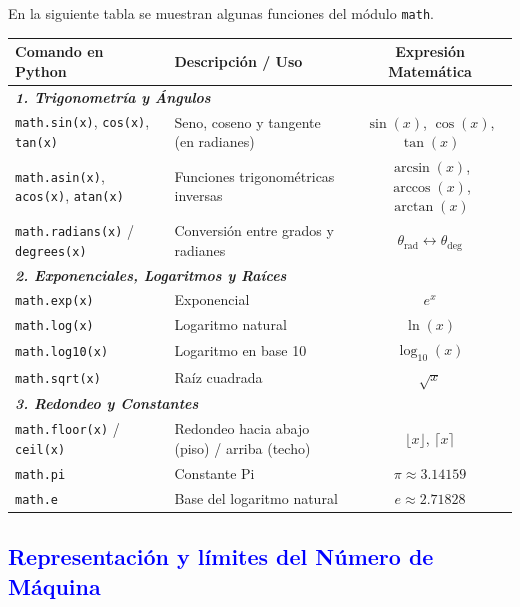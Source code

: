 \documentclass[12pt]{article}
\begin{document}
En la siguiente tabla se muestran algunas funciones del módulo \texttt{math}. 

\begin{table}[h!]
\centering
\small
\begin{tabular}{l l c}
\toprule
\textbf{Comando en Python} & \textbf{Descripción / Uso} & \textbf{Expresión Matemática} \\
\midrule

\multicolumn{3}{l}{\textbf{\textit{1. Trigonometría y Ángulos}}} \\
\texttt{math.sin(x)}, \texttt{cos(x)}, \texttt{tan(x)} & Seno, coseno y tangente (en radianes) & $\sin(x)$, $\cos(x)$, $\tan(x)$ \\
\texttt{math.asin(x)}, \texttt{acos(x)}, \texttt{atan(x)} & Funciones trigonométricas inversas & $\arcsin(x)$, $\arccos(x)$, $\arctan(x)$ \\
\texttt{math.radians(x)} / \texttt{degrees(x)} & Conversión entre grados y radianes & $\theta_{\text{rad}} \leftrightarrow \theta_{\text{deg}}$ \\

\midrule
\multicolumn{3}{l}{\textbf{\textit{2. Exponenciales, Logaritmos y Raíces}}} \\
\texttt{math.exp(x)} & Exponencial & $e^x$ \\
\texttt{math.log(x)} & Logaritmo natural & $\ln(x)$ \\
\texttt{math.log10(x)} & Logaritmo en base 10 & $\log_{10}(x)$ \\
\texttt{math.sqrt(x)} & Raíz cuadrada & $\sqrt{x}$ \\

\midrule
\multicolumn{3}{l}{\textbf{\textit{3. Redondeo y Constantes}}} \\
\texttt{math.floor(x)} / \texttt{ceil(x)} & Redondeo hacia abajo (piso) / arriba (techo) & $\lfloor x \rfloor$, $\lceil x \rceil$ \\
\texttt{math.pi} & Constante Pi & $\pi \approx 3.14159$ \\
\texttt{math.e} & Base del logaritmo natural & $e \approx 2.71828$ \\

\bottomrule
\end{tabular}
\end{table}

\subsection*{\textcolor{blue}{Representación y límites del Número de Máquina}}
\end{document}
